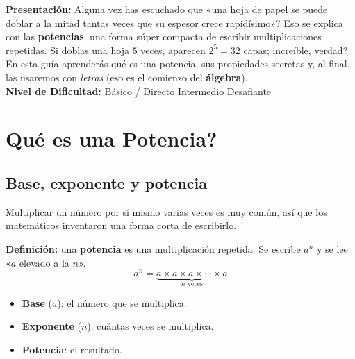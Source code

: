 \documentclass[12pt, letterpaper]{article}
\begin{document}


\vspace{4pt}
\begin{cuadroinfo}
  \small
  \textbf{Presentación:} \textquestiondown Alguna vez has escuchado que «una hoja de papel se puede doblar a la mitad tantas veces que su espesor crece rapidísimo»? Eso se explica con las \textbf{potencias}: una forma súper compacta de escribir multiplicaciones repetidas. Si doblas una hoja $5$ veces, aparecen $2^5 = 32$ capas; \textquestiondown increíble, verdad? En esta guía aprenderás qué es una potencia, sus propiedades secretas y, al final, las usaremos con \emph{letras} (eso es el comienzo del \textbf{álgebra}).
  \\[4pt]
  \textbf{Nivel de Dificultad:}\quad
  \facil{} Básico / Directo \quad
  \medio{} Intermedio \quad
  \dificil{} Desafiante
\end{cuadroinfo}

\vspace{8pt}

\section{\textquestiondown Qué es una Potencia?}

\subsection{Base, exponente y potencia}

Multiplicar un número por sí mismo varias veces es muy común, así que los matemáticos inventaron una forma corta de escribirlo.

\begin{cuadroteoria}
  \textbf{Definición:} una \textbf{potencia} es una multiplicación repetida. Se escribe $a^n$ y se lee «$a$ elevado a la $n$».
  \[
    a^n = \underbrace{a \times a \times a \times \cdots \times a}_{n \text{ veces}}
  \]
  \begin{itemize}
    \item \textbf{Base} ($a$): el número que se multiplica.
    \item \textbf{Exponente} ($n$): cuántas veces se multiplica.
    \item \textbf{Potencia}: el resultado.
  \end{itemize}
\end{cuadroteoria}
\end{document}
